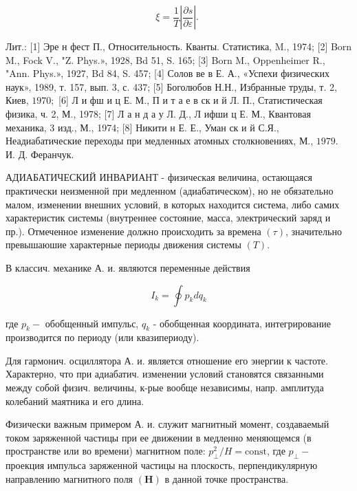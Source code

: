 \documentclass[10pt]{article}
\begin{document}
\[

\xi=\frac{1}{T}\left|\frac{\partial s}{\partial \varepsilon}\right| \text {. }

\]



Лит.: [1] Эре н фест П., Относительность. Кванты. Статистика, M., 1974; [2] Born M., Fock V., "Z. Phys.», 1928, Bd 51, S. 165; [3] Born M., Oppenheimer R., "Ann. Phys.», 1927, Bd 84, S. 457; [4] Солов ве в Е. А., «Успехи физических наук», 1989, т. 157, вып. 3, с. 437; [5] Боголюбов Н.Н., Избранные труды, т. 2, Киев, $1970 ;$ [6] Л и фш и ц Е. М., П и т а е в ск и й Л. П., Статистическая физика, ч. 2, М., 1978; [7] Л а н д а у Л. Д., Л ифши ц Е. М., Квантовая механика, 3 изд., М., 1974; [8] Никити н Е. Е., Уман ск и й С.Я., Неадиабатические переходы при медленных атомных столкновениях, М., $1979 . \quad$ И. Д. Феранчук.



АДИАБАТИЧЕСКИЙ ИНВАРИАНТ - физическая величина, остающаяся практически неизменной при медленном (адиабатическом), но не обязательно малом, изменении внешних условий, в которых находится система, либо самих характеристик системы (внутреннее состояние, масса, электрический заряд и пр.). Отмеченное изменение должно происходить за времена $(\tau)$, значительно превышаюшие характерные периоды движения системы $(T)$.



В классич. механике А. и. являются переменные действия



\[

I_{k}=\oint p_{k} d q_{k}

\]



где $p_{k}-$ обобщенный импульс, $q_{k}$ - обобщенная координата, интегрирование производится по периоду (или квазипериоду).



Для гармонич. осциллятора А. и. является отношение его энергии к частоте. Характерно, что при адиабатич. изменении условий становятся связанными между собой физич. величины, к-рые вообще независимы, напр. амплитуда колебаний маятника и его длина.



Физически важным примером А. и. служит магнитный момент, создаваемый током заряженной частицы при ее движении в медленно меняющемся (в пространстве или во времени) магнитном поле: $p_{\perp}^{2} / H=\mathrm{const}$, где $p_{\perp}-$ проекция импульса заряженной частицы на плоскость, перпендикулярную направлению магнитного поля $(\boldsymbol{H})$ в данной точке пространства.
\end{document}
